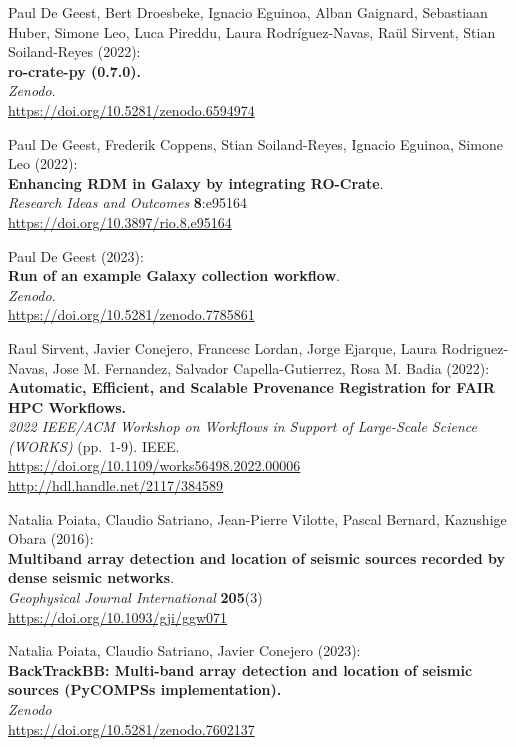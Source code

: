 \documentclass[10pt,letterpaper]{article}
\begin{document}
\begin{thebibliography}{10}
\begin{small}
Paul De Geest, Bert Droesbeke, Ignacio Eguinoa,
Alban Gaignard, Sebastiaan Huber, Simone Leo, Luca Pireddu,
Laura Rodríguez-Navas, Raül Sirvent, Stian Soiland-Reyes (2022):\\
\textbf{ro-crate-py (0.7.0).}\\
\emph{Zenodo}.\\
\url{https://doi.org/10.5281/zenodo.6594974}

 Paul De Geest, Frederik Coppens, Stian Soiland-Reyes, Ignacio Eguinoa, Simone Leo (2022):\\
\textbf{Enhancing RDM in Galaxy by integrating RO-Crate}.\\
\emph{Research Ideas and Outcomes} \textbf{8}:e95164\\
\url{https://doi.org/10.3897/rio.8.e95164}


Paul De Geest (2023):\\
\textbf{Run of an example Galaxy collection workflow}.\\
\emph{Zenodo}.\\
\url{https://doi.org/10.5281/zenodo.7785861}



Raul Sirvent, Javier Conejero, Francesc Lordan, Jorge Ejarque, Laura Rodriguez-Navas, Jose M. Fernandez, Salvador Capella-Gutierrez, Rosa M. Badia (2022):\\
\textbf{Automatic, Efficient, and Scalable Provenance Registration for
FAIR HPC Workflows.}\\
\emph{2022 IEEE/ACM Workshop on Workflows in Support of Large-Scale Science (WORKS)} (pp.~1-9). IEEE.\\
\url{https://doi.org/10.1109/works56498.2022.00006}\\
\url{http://hdl.handle.net/2117/384589}

Natalia Poiata, Claudio Satriano, Jean-Pierre Vilotte, Pascal Bernard, Kazushige Obara (2016):\\
\textbf{Multiband array detection and location of seismic sources recorded by dense seismic networks}.\\
\emph{Geophysical Journal International} \textbf{205}(3)\\
\url{https://doi.org/10.1093/gji/ggw071}

Natalia Poiata, Claudio Satriano, Javier Conejero (2023):\\
\textbf{BackTrackBB: Multi-band array detection and location of seismic sources (PyCOMPSs implementation).}\\
\emph{Zenodo}\\
\url{https://doi.org/10.5281/zenodo.7602137}


\end{small}
\end{thebibliography}
\end{document}
